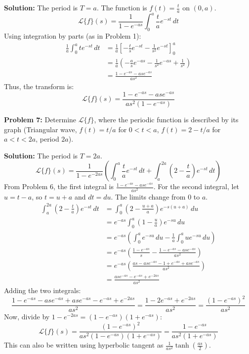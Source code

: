 \documentclass[11pt, letterpaper]{article}
\theoremstyle{definition}
\theoremstyle{remark}
\begin{document}
\textbf{Solution:}
The period is $T = a$. The function is $f(t) = \frac{t}{a}$ on $(0, a)$.
\[ \mathcal{L}\{f\}(s) = \frac{1}{1 - e^{-as}} \int_0^a \frac{t}{a} e^{-st} \, dt \]
Using integration by parts (as in Problem 1):
\begin{align*}
    \frac{1}{a} \int_0^a t e^{-st} \, dt &= \frac{1}{a} \left[ -\frac{t}{s}e^{-st} - \frac{1}{s^2}e^{-st} \right]_0^a \\
    &= \frac{1}{a} \left( -\frac{a}{s}e^{-as} - \frac{1}{s^2}e^{-as} + \frac{1}{s^2} \right) \\
    &= \frac{1 - e^{-as} - as e^{-as}}{a s^2}
\end{align*}
Thus, the transform is:
\[ \mathcal{L}\{f\}(s) = \frac{1 - e^{-as} - as e^{-as}}{a s^2 (1 - e^{-as})} \]

\vspace{1em}
\textbf{Problem 7:} Determine $\mathcal{L}\{f\}$, where the periodic function is described by its graph (Triangular wave, $f(t) = t/a$ for $0 < t < a$, $f(t) = 2 - t/a$ for $a < t < 2a$, period $2a$).

\textbf{Solution:}
The period is $T = 2a$.
\[ \mathcal{L}\{f\}(s) = \frac{1}{1 - e^{-2as}} \left( \int_0^a \frac{t}{a} e^{-st} \, dt + \int_a^{2a} \left(2 - \frac{t}{a}\right) e^{-st} \, dt \right) \]
From Problem 6, the first integral is $\frac{1 - e^{-as} - as e^{-as}}{a s^2}$.
For the second integral, let $u = t - a$, so $t = u + a$ and $dt = du$. The limits change from $0$ to $a$.
\begin{align*}
    \int_a^{2a} \left(2 - \frac{t}{a}\right) e^{-st} \, dt &= \int_0^a \left(2 - \frac{u+a}{a}\right) e^{-s(u+a)} \, du \\
    &= e^{-as} \int_0^a \left(1 - \frac{u}{a}\right) e^{-su} \, du \\
    &= e^{-as} \left( \int_0^a e^{-su} \, du - \frac{1}{a} \int_0^a u e^{-su} \, du \right) \\
    &= e^{-as} \left( \frac{1 - e^{-as}}{s} - \frac{1 - e^{-as} - as e^{-as}}{a s^2} \right) \\
    &= e^{-as} \left( \frac{as - as e^{-as} - 1 + e^{-as} + as e^{-as}}{a s^2} \right) \\
    &= \frac{as e^{-as} - e^{-as} + e^{-2as}}{a s^2}
\end{align*}
Adding the two integrals:
\[ \frac{1 - e^{-as} - as e^{-as} + as e^{-as} - e^{-as} + e^{-2as}}{a s^2} = \frac{1 - 2e^{-as} + e^{-2as}}{a s^2} = \frac{(1 - e^{-as})^2}{a s^2} \]
Now, divide by $1 - e^{-2as} = (1 - e^{-as})(1 + e^{-as})$:
\[ \mathcal{L}\{f\}(s) = \frac{(1 - e^{-as})^2}{a s^2 (1 - e^{-as})(1 + e^{-as})} = \frac{1 - e^{-as}}{a s^2 (1 + e^{-as})} \]
This can also be written using hyperbolic tangent as $\frac{1}{a s^2} \tanh\left(\frac{as}{2}\right)$.
\end{document}
